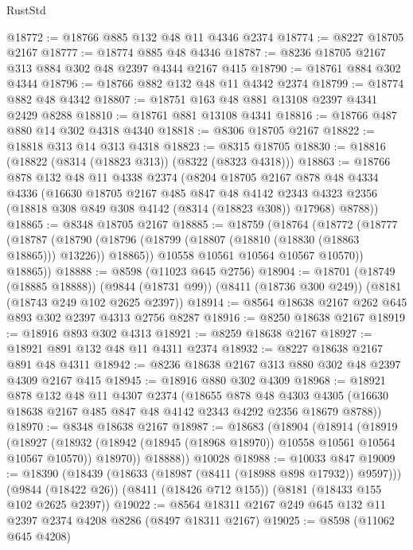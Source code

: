 \begin{lexlean}{RustStd}
\begin{coremodule}
@18772 := @18766 @885 @132 @48 @11 @4346 @2374
@18774 := @8227 @18705 @2167
@18777 := @18774 @885 @48 @4346
@18787 := @8236 @18705 @2167 @313 @884 @302 @48 @2397 @4344 @2167 @415
@18790 := @18761 @884 @302 @4344
@18796 := @18766 @882 @132 @48 @11 @4342 @2374
@18799 := @18774 @882 @48 @4342
@18807 := @18751 @163 @48 @881 @13108 @2397 @4341 @2429 @8288
@18810 := @18761 @881 @13108 @4341
@18816 := @18766 @487 @880 @14 @302 @4318 @4340
@18818 := @8306 @18705 @2167
@18822 := @18818 @313 @14 @313 @4318
@18823 := @8315 @18705
@18830 := @18816 (@18822 (@8314 (@18823 @313)) (@8322 (@8323 @4318)))
@18863 := @18766
    @878
    @132
    @48
    @11
    @4338
    @2374
    (@8204
      @18705
      @2167
      @878
      @48
      @4334
      @4336
      (@16630
        @18705
        @2167
        @485
        @847
        @48
        @4142
        @2343
        @4323
        @2356
        (@18818 @308 @849 @308 @4142 (@8314 (@18823 @308)) @17968)
        @8788))
@18865 := @8348 @18705 @2167
@18885 := @18759
    (@18764
      (@18772
        (@18777
          (@18787
            (@18790 (@18796 (@18799 (@18807 (@18810 (@18830 (@18863 @18865))) @13226)) @18865))
            @10558
            @10561
            @10564
            @10567
            @10570))
        @18865))
@18888 := @8598 (@11023 @645 @2756)
@18904 := @18701
    (@18749 (@18885 @18888))
    (@9844 (@18731 @99))
    (@8411 (@18736 @300 @249))
    (@8181 (@18743 @249 @102 @2625 @2397))
@18914 := @8564 @18638 @2167 @262 @645 @893 @302 @2397 @4313 @2756 @8287
@18916 := @8250 @18638 @2167
@18919 := @18916 @893 @302 @4313
@18921 := @8259 @18638 @2167
@18927 := @18921 @891 @132 @48 @11 @4311 @2374
@18932 := @8227 @18638 @2167 @891 @48 @4311
@18942 := @8236 @18638 @2167 @313 @880 @302 @48 @2397 @4309 @2167 @415
@18945 := @18916 @880 @302 @4309
@18968 := @18921
    @878
    @132
    @48
    @11
    @4307
    @2374
    (@18655
      @878
      @48
      @4303
      @4305
      (@16630 @18638 @2167 @485 @847 @48 @4142 @2343 @4292 @2356 @18679 @8788))
@18970 := @8348 @18638 @2167
@18987 := @18683
    (@18904
      (@18914
        (@18919
          (@18927
            (@18932 (@18942 (@18945 (@18968 @18970)) @10558 @10561 @10564 @10567 @10570))
            @18970))
        @18888))
    @10028
@18988 := @10033 @847
@19009 := @18390
    (@18439 (@18633 (@18987 (@8411 (@18988 @898 @17932)) @9597)))
    (@9844 (@18422 @26))
    (@8411 (@18426 @712 @155))
    (@8181 (@18433 @155 @102 @2625 @2397))
@19022 := @8564 @18311 @2167 @249 @645 @132 @11 @2397 @2374 @4208 @8286 (@8497 @18311 @2167)
@19025 := @8598 (@11062 @645 @4208)

\end{coremodule}
\end{lexlean}

